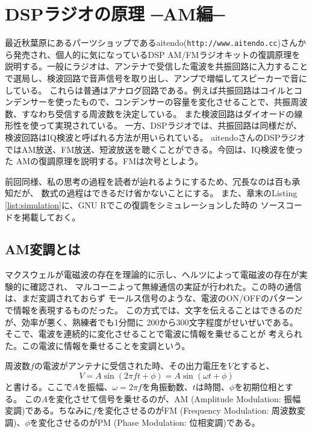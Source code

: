 \chapter*{DSPラジオの原理 ─AM編─}
最近秋葉原にあるパーツショップであるaitendo(\texttt{http://www.aitendo.cc})さんから発売され、個人的に気になっているDSP AM/FMラジオキットの復調原理を説明する。一般にラジオは、アンテナで受信した電波を共振回路に入力することで選局し、検波回路で音声信号を取り出し、アンプで増幅してスピーカーで音にしている。
%
これらは普通はアナログ回路である。例えば共振回路はコイルとコンデンサーを使ったもので、コンデンサーの容量を変化させることで、共振周波数、すなわち受信する周波数を決定している。
また検波回路はダイオードの線形性を使って実現されている。
一方、DSPラジオでは、共振回路は同様だが、検波回路はIQ検波と呼ばれる方法が用いられている。
aitendoさんのDSPラジオではAM放送、FM放送、短波放送を聴くことができる。今回は、IQ検波を使った
AMの復調原理を説明する。FMは次号としよう。

前回同様、私の思考の過程を読者が辿れるようにするため、冗長なのは百も承知だが、
数式の過程はできるだけ省かないことにする。
また、章末のListing \ref{list:simulation}に、GNU Rでこの復調をシミュレーションした時の
ソースコードを掲載しておく。

\section*{AM変調とは}
マクスウェルが電磁波の存在を理論的に示し、ヘルツによって電磁波の存在が実験的に確認され、
マルコーニよって無線通信の実証が行われた。この時の通信は、まだ変調されておらず
モールス信号のような、電波のON/OFFのパターンで情報を表現するものだった。
この方式では、文字を伝えることはできるのだが、効率が悪く、熟練者でも1分間に
200から300文字程度がせいぜいである。
そこで、電波を連続的に変化させることで電波に情報を乗せることが
考えられた。この電波に情報を乗せることを変調という。

周波数$f$の電波がアンテナに受信された時、その出力電圧を$V$とすると、
\begin{equation}
V = A\sin(2 \pi f t + \phi) = A\sin(\omega t + \phi)
\end{equation}
と書ける。ここで$A$を振幅、$\omega=2\pi f$を角振動数、$t$は時間、$\phi$を初期位相とする。
この$A$を変化させて信号を乗せるのが、AM (Amplitude Modulation: 振幅変調)である。ちなみに$f$を変化させるのがFM (Frequency Modulation: 周波数変調)、$\phi$を変化させるのがPM (Phase Modulation: 位相変調)である。

